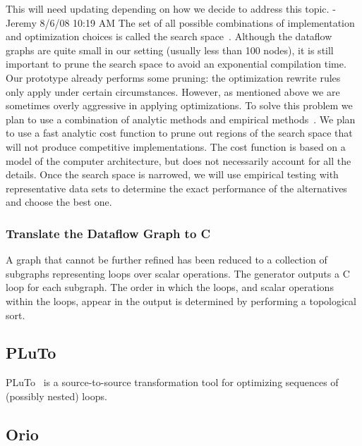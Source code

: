 \documentclass[11pt]{article}
\begin{document}
This will need updating depending on how we decide to address this topic. -Jeremy 8/6/08 10:19 AM 
The set of all possible combinations of implementation and optimization choices is called the search space~\cite{Kisuki:2000uq,Triantafyllis:2003uq, Cooper:2005kx}.  Although the dataflow graphs are quite small in our setting (usually less than 100 nodes), it is still important to prune the search space to avoid an exponential compilation time. Our prototype already performs some pruning: the optimization rewrite rules only apply under certain circumstances.  However, as mentioned above we are sometimes overly aggressive in applying optimizations. To solve this problem we plan to use a combination of analytic methods and empirical methods~\cite{Chen:2007vn}.
We plan to use a fast analytic cost function to prune out regions of the search space that will not produce competitive implementations. The cost function is based on a model of the computer architecture, but does not necessarily account for all the details.  Once the search space is narrowed, we will use empirical testing with representative data sets to determine the exact performance of the alternatives and choose the best one.

\subsubsection{Translate the Dataflow Graph to C}

A graph that cannot be further refined has been reduced to a collection of subgraphs representing loops over scalar operations. The generator outputs a C loop for each subgraph.  The order in which the loops, and scalar operations within the loops, appear in the output is determined by performing a topological sort.





\subsection{PLuTo}
\label{sec:plutonorio}

PLuTo~\cite{Pluto,uday08cc} is a source-to-source transformation tool for optimizing sequences of (possibly nested) loops.

\subsection{Orio}
\label{sec:orio}
\end{document}
